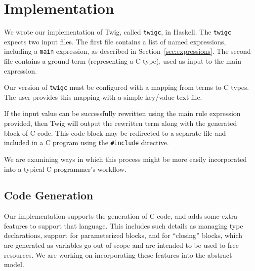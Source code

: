 
\section{Implementation}

We wrote our implementation of Twig, called \texttt{twigc}, in
Haskell. The \texttt{twigc} expects two input files. The first
file contains a list of named expressions, including a
\texttt{main} expression, as described in
Section~\ref{sec:expressions}. The second file contains a ground
term (representing a C type), used as input to the main
expression.

Our version of \texttt{twigc} must be configured with a mapping
from terms to C types. The user provides this mapping with a
simple key/value text file.

If the input value can be successfully rewritten using the main
rule expression provided, then Twig will output the rewritten term
along with the generated block of C code. This code block may be
redirected to a separate file and included in a C program using
the \texttt{\#include} directive.

We are examining ways in which this process might be more easily
incorporated into a typical C programmer's workflow.

\subsection{Code Generation}

Our implementation supports the generation of C code, and adds
some extra features to support that language. This includes such
details as managing type declarations, support for parameterized
blocks, and for ``closing'' blocks, which are generated as
variables go out of scope and are intended to be used to free
resources. We are working on incorporating these features into the
abstract model.
